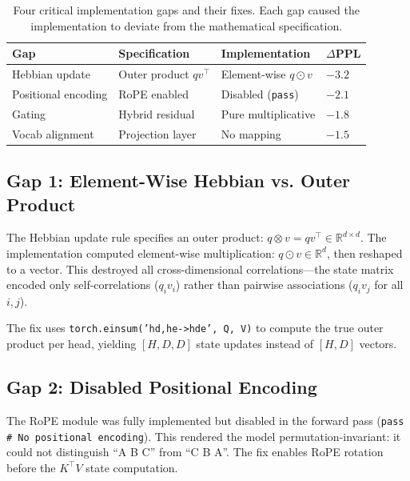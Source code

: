 \documentclass{article}
\begin{document}
\begin{table}[t]
    \centering
    \caption{Four critical implementation gaps and their fixes. Each gap caused the implementation to deviate from the mathematical specification.}
    \label{tab:bugs}
    \begin{tabular}{@{}lp{3.5cm}p{3.5cm}p{2.5cm}@{}}
        \toprule
        \textbf{Gap} & \textbf{Specification} & \textbf{Implementation} & \textbf{$\Delta$PPL} \\
        \midrule
        Hebbian update & Outer product $q v^\top$ & Element-wise $q \odot v$ & $-3.2$ \\
        Positional encoding & RoPE enabled & Disabled (\texttt{pass}) & $-2.1$ \\
        Gating & Hybrid residual & Pure multiplicative & $-1.8$ \\
        Vocab alignment & Projection layer & No mapping & $-1.5$ \\
        \bottomrule
    \end{tabular}
\end{table}

\subsection{Gap 1: Element-Wise Hebbian vs. Outer Product}

The Hebbian update rule specifies an outer product: $q \otimes v = q v^\top \in \mathbb{R}^{d \times d}$. The implementation computed element-wise multiplication: $q \odot v \in \mathbb{R}^d$, then reshaped to a vector. This destroyed all cross-dimensional correlations---the state matrix encoded only self-correlations ($q_i v_i$) rather than pairwise associations ($q_i v_j$ for all $i,j$).

The fix uses \texttt{torch.einsum('hd,he->hde', Q, V)} to compute the true outer product per head, yielding $[H, D, D]$ state updates instead of $[H, D]$ vectors.

\subsection{Gap 2: Disabled Positional Encoding}

The RoPE module was fully implemented but disabled in the forward pass (\texttt{pass \# No positional encoding}). This rendered the model permutation-invariant: it could not distinguish ``A B C'' from ``C B A''. The fix enables RoPE rotation before the $K^\top V$ state computation.
\end{document}
